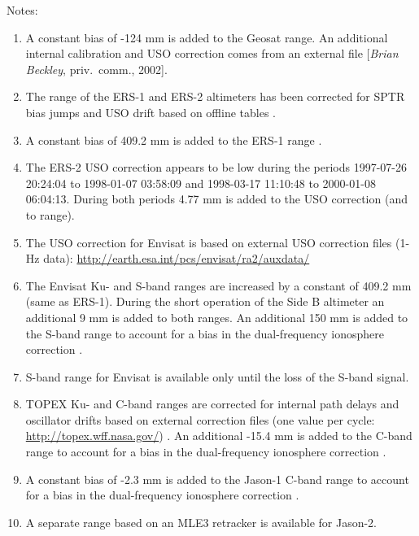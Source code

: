 \documentclass[a4paper,11pt,openany,natbib]{thesis}
\begin{document}
Notes:
\begin{enumerate}
\item A constant bias of -124 mm is added to the Geosat range. An additional internal calibration and USO correction comes from an external file [\emph{Brian Beckley}, priv.\ comm., 2002].
\item The range of the ERS-1 and ERS-2 altimeters has been corrected for SPTR bias jumps and USO drift based on offline tables \citep{martini2000}.
\item A constant bias of 409.2 mm is added to the ERS-1 range \citep{francis1993b,stum1998a}.
\item The ERS-2 USO correction appears to be low during the periods 1997-07-26 20:24:04 to 1998-01-07 03:58:09 and 1998-03-17 11:10:48 to 2000-01-08 06:04:13. During both periods 4.77 mm is added to the USO correction (and to range).
\item The USO correction for Envisat is based on external USO correction files (1-Hz data): \url{http://earth.esa.int/pcs/envisat/ra2/auxdata/}
\item The Envisat Ku- and S-band ranges are increased by a constant of 409.2 mm (same as ERS-1). During the short operation of the Side B altimeter an additional 9 mm is added to both ranges. An additional 150 mm is added to the S-band range to account for a bias in the dual-frequency ionosphere correction \citep{scharroo2010a}.
\item S-band range for Envisat is available only until the loss of the S-band signal.
\item TOPEX Ku- and C-band ranges are corrected for internal path delays and oscillator drifts based on external correction files (one value per cycle: \url{http://topex.wff.nasa.gov/}) \citep{hayne1994}. An additional -15.4 mm is added to the C-band range to account for a bias in the dual-frequency ionosphere correction \citep{scharroo2010a}.
\item A constant bias of -2.3 mm is added to the Jason-1 C-band range to account for a bias in the dual-frequency ionosphere correction \citep{scharroo2010a}.
\item A separate range based on an MLE3 retracker is available for Jason-2.\label{item:range_ku_mle3}
\end{enumerate}
\end{document}
